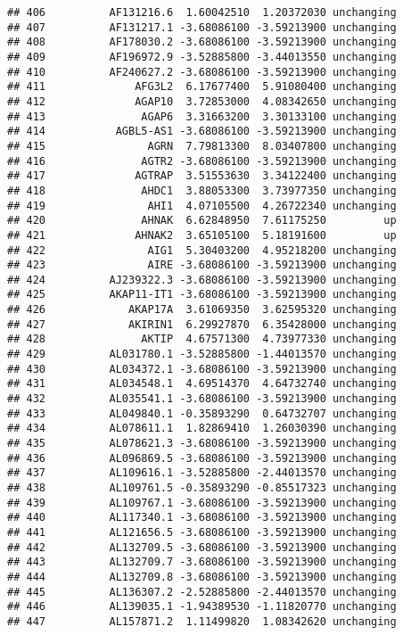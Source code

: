 \documentclass[]{article}
\begin{document}
\begin{verbatim}
## 406          AF131216.6  1.60042510  1.20372030 unchanging
## 407          AF131217.1 -3.68086100 -3.59213900 unchanging
## 408          AF178030.2 -3.68086100 -3.59213900 unchanging
## 409          AF196972.9 -3.52885800 -3.44013550 unchanging
## 410          AF240627.2 -3.68086100 -3.59213900 unchanging
## 411              AFG3L2  6.17677400  5.91080400 unchanging
## 412              AGAP10  3.72853000  4.08342650 unchanging
## 413               AGAP6  3.31663200  3.30133100 unchanging
## 414           AGBL5-AS1 -3.68086100 -3.59213900 unchanging
## 415                AGRN  7.79813300  8.03407800 unchanging
## 416               AGTR2 -3.68086100 -3.59213900 unchanging
## 417              AGTRAP  3.51553630  3.34122400 unchanging
## 418               AHDC1  3.88053300  3.73977350 unchanging
## 419                AHI1  4.07105500  4.26722340 unchanging
## 420               AHNAK  6.62848950  7.61175250         up
## 421              AHNAK2  3.65105100  5.18191600         up
## 422                AIG1  5.30403200  4.95218200 unchanging
## 423                AIRE -3.68086100 -3.59213900 unchanging
## 424          AJ239322.3 -3.68086100 -3.59213900 unchanging
## 425          AKAP11-IT1 -3.68086100 -3.59213900 unchanging
## 426             AKAP17A  3.61069350  3.62595320 unchanging
## 427             AKIRIN1  6.29927870  6.35428000 unchanging
## 428               AKTIP  4.67571300  4.73977330 unchanging
## 429          AL031780.1 -3.52885800 -1.44013570 unchanging
## 430          AL034372.1 -3.68086100 -3.59213900 unchanging
## 431          AL034548.1  4.69514370  4.64732740 unchanging
## 432          AL035541.1 -3.68086100 -3.59213900 unchanging
## 433          AL049840.1 -0.35893290  0.64732707 unchanging
## 434          AL078611.1  1.82869410  1.26030390 unchanging
## 435          AL078621.3 -3.68086100 -3.59213900 unchanging
## 436          AL096869.5 -3.68086100 -3.59213900 unchanging
## 437          AL109616.1 -3.52885800 -2.44013570 unchanging
## 438          AL109761.5 -0.35893290 -0.85517323 unchanging
## 439          AL109767.1 -3.68086100 -3.59213900 unchanging
## 440          AL117340.1 -3.68086100 -3.59213900 unchanging
## 441          AL121656.5 -3.68086100 -3.59213900 unchanging
## 442          AL132709.5 -3.68086100 -3.59213900 unchanging
## 443          AL132709.7 -3.68086100 -3.59213900 unchanging
## 444          AL132709.8 -3.68086100 -3.59213900 unchanging
## 445          AL136307.2 -2.52885800 -2.44013570 unchanging
## 446          AL139035.1 -1.94389530 -1.11820770 unchanging
## 447          AL157871.2  1.11499820  1.08342620 unchanging

\end{verbatim}
\end{document}
